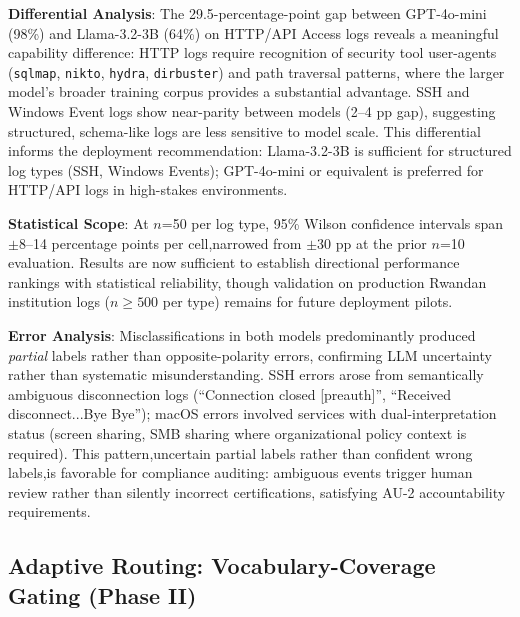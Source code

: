 \documentclass[futureinternet,article,submit,pdftex,moreauthors]{Definitions/mdpi}
\begin{document}
\textbf{Differential Analysis}: The 29.5-percentage-point gap between GPT-4o-mini (98\%)
and Llama-3.2-3B (64\%) on HTTP/API Access logs reveals a meaningful capability difference:
HTTP logs require recognition of security tool user-agents (\texttt{sqlmap}, \texttt{nikto},
\texttt{hydra}, \texttt{dirbuster}) and path traversal patterns, where the larger model's
broader training corpus provides a substantial advantage. SSH and Windows Event logs show
near-parity between models (2--4 pp gap), suggesting structured, schema-like logs are less
sensitive to model scale. This differential informs the deployment recommendation: Llama-3.2-3B
is sufficient for structured log types (SSH, Windows Events); GPT-4o-mini or equivalent is
preferred for HTTP/API logs in high-stakes environments.

\textbf{Statistical Scope}: At $n$=50 per log type, 95\% Wilson confidence intervals span
$\pm$8--14 percentage points per cell,narrowed from $\pm$30 pp at the prior $n$=10
evaluation. Results are now sufficient to establish directional performance rankings
with statistical reliability, though validation on production Rwandan institution logs
($n \geq 500$ per type) remains for future deployment pilots.

\textbf{Error Analysis}: Misclassifications in both models predominantly produced
\textit{partial} labels rather than opposite-polarity errors, confirming LLM uncertainty
rather than systematic misunderstanding. SSH errors arose from semantically ambiguous
disconnection logs (``Connection closed [preauth]'', ``Received disconnect...Bye Bye'');
macOS errors involved services with dual-interpretation status (screen sharing, SMB sharing
where organizational policy context is required). This pattern,uncertain partial labels
rather than confident wrong labels,is favorable for compliance auditing: ambiguous events
trigger human review rather than silently incorrect certifications, satisfying AU-2
accountability requirements.

\subsection{Adaptive Routing: Vocabulary-Coverage Gating (Phase II)}
\label{sec:phase2_router}
\end{document}
